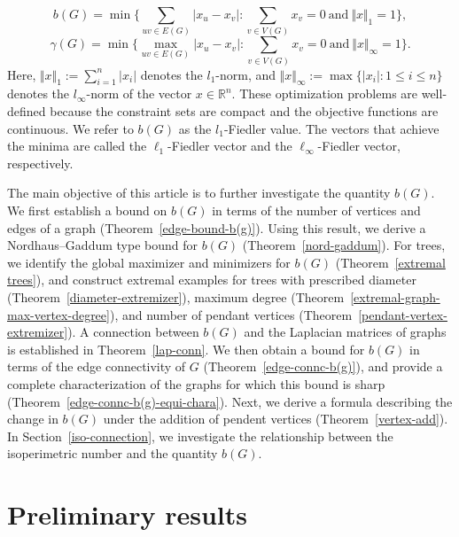 \documentclass[12pt]{article}
\begin{document}
$$
b(G)=\min\biggl\{\sum_{uv \in E(G)}\vert x_u - x_v\vert: \sum_{v \in V(G)}x_v=0~\mbox{and}~ \Vert x \Vert_{1}=1\biggl\},
$$
$$
\gamma(G)=\min\biggl\{\max_{uv \in E(G)}\vert x_u - x_v\vert: \sum_{v \in V(G)} x_v =0 ~\mbox{and}~\Vert x \Vert _{\infty}=1\biggl\}.
$$
Here, $\Vert x \Vert_1 := \sum\limits_{i=1}^n |x_i|$ denotes the $l_1$-norm, and $\Vert x \Vert_\infty := \max \{ |x_i| : 1 \leq i \leq n \}$ denotes the $l_\infty$-norm of the vector $x \in \mathbb{R}^n$. These optimization problems are well-defined because the constraint sets are compact and the objective functions are continuous. We refer to $b(G)$ as the $l_1$-Fiedler value. The vectors that achieve the minima are called the \(\ell_1\)-Fiedler vector and the \(\ell_\infty\)-Fiedler vector, respectively. 
 

The main objective of this article is to further investigate the quantity $b(G)$. We first establish a bound on $b(G)$ in terms of the number of vertices and edges of a graph (Theorem~\ref{edge-bound-b(g)}). Using this result, we derive a Nordhaus--Gaddum type bound for $b(G)$ (Theorem~\ref{nord-gaddum}).  For trees, we identify the global maximizer and minimizers for $b(G)$ (Theorem~\ref{extremal trees}), and construct extremal examples for trees with prescribed diameter (Theorem~\ref{diameter-extremizer}), maximum degree (Theorem~\ref{extremal-graph-max-vertex-degree}), and number of pendant vertices (Theorem~\ref{pendant-vertex-extremizer}).  A connection between $b(G)$ and the Laplacian matrices of graphs is established in Theorem~\ref{lap-conn}.  We then obtain a bound for $b(G)$ in terms of the edge connectivity of $ G $ (Theorem~\ref{edge-connc-b(g)}), and provide a complete characterization of the graphs for which this bound is sharp (Theorem~\ref{edge-connc-b(g)-equi-chara}). Next, we derive a formula describing the change in $b(G)$ under the addition of pendent vertices (Theorem~\ref{vertex-add}). In Section~\ref{iso-connection}, we investigate the relationship between the isoperimetric number and the quantity $b(G)$.


\section{Preliminary results}
\end{document}
